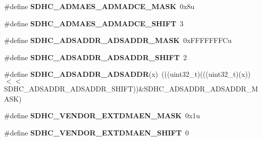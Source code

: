 \begin{DoxyCompactItemize}
\item 
\#define {\bfseries S\+D\+H\+C\+\_\+\+A\+D\+M\+A\+E\+S\+\_\+\+A\+D\+M\+A\+D\+C\+E\+\_\+\+M\+A\+SK}~0x8u\hypertarget{group__SDHC__Register__Masks_ga2c0005f89f635749f423284e92025434}{}\label{group__SDHC__Register__Masks_ga2c0005f89f635749f423284e92025434}

\item 
\#define {\bfseries S\+D\+H\+C\+\_\+\+A\+D\+M\+A\+E\+S\+\_\+\+A\+D\+M\+A\+D\+C\+E\+\_\+\+S\+H\+I\+FT}~3\hypertarget{group__SDHC__Register__Masks_gab96190a44e154d4acd156f0026d4c363}{}\label{group__SDHC__Register__Masks_gab96190a44e154d4acd156f0026d4c363}

\item 
\#define {\bfseries S\+D\+H\+C\+\_\+\+A\+D\+S\+A\+D\+D\+R\+\_\+\+A\+D\+S\+A\+D\+D\+R\+\_\+\+M\+A\+SK}~0x\+F\+F\+F\+F\+F\+F\+F\+Cu\hypertarget{group__SDHC__Register__Masks_gaf351e8cc179a6507219df80133e901dd}{}\label{group__SDHC__Register__Masks_gaf351e8cc179a6507219df80133e901dd}

\item 
\#define {\bfseries S\+D\+H\+C\+\_\+\+A\+D\+S\+A\+D\+D\+R\+\_\+\+A\+D\+S\+A\+D\+D\+R\+\_\+\+S\+H\+I\+FT}~2\hypertarget{group__SDHC__Register__Masks_ga6bad5e40bfb6829aa79079fa8748a7d1}{}\label{group__SDHC__Register__Masks_ga6bad5e40bfb6829aa79079fa8748a7d1}

\item 
\#define {\bfseries S\+D\+H\+C\+\_\+\+A\+D\+S\+A\+D\+D\+R\+\_\+\+A\+D\+S\+A\+D\+DR}(x)~(((uint32\+\_\+t)(((uint32\+\_\+t)(x))$<$$<$S\+D\+H\+C\+\_\+\+A\+D\+S\+A\+D\+D\+R\+\_\+\+A\+D\+S\+A\+D\+D\+R\+\_\+\+S\+H\+I\+FT))\&S\+D\+H\+C\+\_\+\+A\+D\+S\+A\+D\+D\+R\+\_\+\+A\+D\+S\+A\+D\+D\+R\+\_\+\+M\+A\+SK)\hypertarget{group__SDHC__Register__Masks_ga4e9df4f22bb72c4482aadfdddc916b5e}{}\label{group__SDHC__Register__Masks_ga4e9df4f22bb72c4482aadfdddc916b5e}

\item 
\#define {\bfseries S\+D\+H\+C\+\_\+\+V\+E\+N\+D\+O\+R\+\_\+\+E\+X\+T\+D\+M\+A\+E\+N\+\_\+\+M\+A\+SK}~0x1u\hypertarget{group__SDHC__Register__Masks_ga83921c53d734582d4faefacf105dab13}{}\label{group__SDHC__Register__Masks_ga83921c53d734582d4faefacf105dab13}

\item 
\#define {\bfseries S\+D\+H\+C\+\_\+\+V\+E\+N\+D\+O\+R\+\_\+\+E\+X\+T\+D\+M\+A\+E\+N\+\_\+\+S\+H\+I\+FT}~0\hypertarget{group__SDHC__Register__Masks_ga983ed2560d2e6ab70865f447d0519d07}{}\label{group__SDHC__Register__Masks_ga983ed2560d2e6ab70865f447d0519d07}


\end{DoxyCompactItemize}
